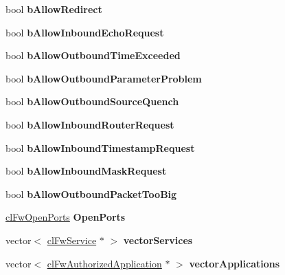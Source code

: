 \begin{DoxyCompactItemize}
\item 
\hypertarget{classcl_fw_profile_a79ad13e697f27aef7cbb156338ce245e}{
bool {\bfseries bAllowRedirect}}
\label{classcl_fw_profile_a79ad13e697f27aef7cbb156338ce245e}

\item 
\hypertarget{classcl_fw_profile_a55024cbdd546d63f717f75c31cbf6c73}{
bool {\bfseries bAllowInboundEchoRequest}}
\label{classcl_fw_profile_a55024cbdd546d63f717f75c31cbf6c73}

\item 
\hypertarget{classcl_fw_profile_aba460af9753b31f2ec61349b5ddeb089}{
bool {\bfseries bAllowOutboundTimeExceeded}}
\label{classcl_fw_profile_aba460af9753b31f2ec61349b5ddeb089}

\item 
\hypertarget{classcl_fw_profile_a7e9f010265c9ffad16eedf6d38ee6a31}{
bool {\bfseries bAllowOutboundParameterProblem}}
\label{classcl_fw_profile_a7e9f010265c9ffad16eedf6d38ee6a31}

\item 
\hypertarget{classcl_fw_profile_a02167d626168ce5826ad9bf430724972}{
bool {\bfseries bAllowOutboundSourceQuench}}
\label{classcl_fw_profile_a02167d626168ce5826ad9bf430724972}

\item 
\hypertarget{classcl_fw_profile_a2cc1d51c2955c462cfa1957e66aaf755}{
bool {\bfseries bAllowInboundRouterRequest}}
\label{classcl_fw_profile_a2cc1d51c2955c462cfa1957e66aaf755}

\item 
\hypertarget{classcl_fw_profile_a8c40b8fde27512696d202ac3804c79ef}{
bool {\bfseries bAllowInboundTimestampRequest}}
\label{classcl_fw_profile_a8c40b8fde27512696d202ac3804c79ef}

\item 
\hypertarget{classcl_fw_profile_a6b29e396482048ac0ff98aa25166468a}{
bool {\bfseries bAllowInboundMaskRequest}}
\label{classcl_fw_profile_a6b29e396482048ac0ff98aa25166468a}

\item 
\hypertarget{classcl_fw_profile_a89d4aa3c546d548e838930b9f3dfe5dd}{
bool {\bfseries bAllowOutboundPacketTooBig}}
\label{classcl_fw_profile_a89d4aa3c546d548e838930b9f3dfe5dd}

\item 
\hypertarget{classcl_fw_profile_ae92a48ee840bf767b77d8366fb80d088}{
\hyperlink{classcl_fw_open_ports}{clFwOpenPorts} {\bfseries OpenPorts}}
\label{classcl_fw_profile_ae92a48ee840bf767b77d8366fb80d088}

\item 
\hypertarget{classcl_fw_profile_afc104b05e0fdec99e190346d2e151f32}{
vector$<$ \hyperlink{classcl_fw_service}{clFwService} $\ast$ $>$ {\bfseries vectorServices}}
\label{classcl_fw_profile_afc104b05e0fdec99e190346d2e151f32}

\item 
\hypertarget{classcl_fw_profile_ab35ee0f9f6ac68eef649a8bacc9b6c11}{
vector$<$ \hyperlink{classcl_fw_authorized_application}{clFwAuthorizedApplication} $\ast$ $>$ {\bfseries vectorApplications}}
\label{classcl_fw_profile_ab35ee0f9f6ac68eef649a8bacc9b6c11}

\end{DoxyCompactItemize}
